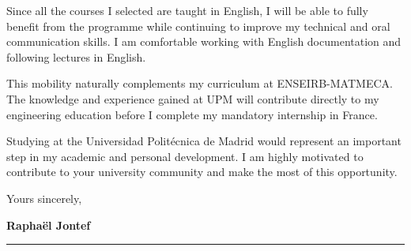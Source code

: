 \documentclass[11pt,a4paper]{letter}
\begin{document}
Since all the courses I selected are taught in English, I will be able
to fully benefit from the programme while continuing to improve my
technical and oral communication skills. I am comfortable working with
English documentation and following lectures in English.

This mobility naturally complements my curriculum at ENSEIRB-MATMECA.
The knowledge and experience gained at UPM will contribute directly to
my engineering education before I complete my mandatory internship in
France.

Studying at the Universidad Politécnica de Madrid would represent an
important step in my academic and personal development. I am highly
motivated to contribute to your university community and make the most
of this opportunity.

\vspace{0.8cm}

Yours sincerely,

\vspace{1.8cm}

\textbf{Raphaël Jontef}

\vfill
{\color{upmblue}\rule{\textwidth}{1pt}}
\end{document}
